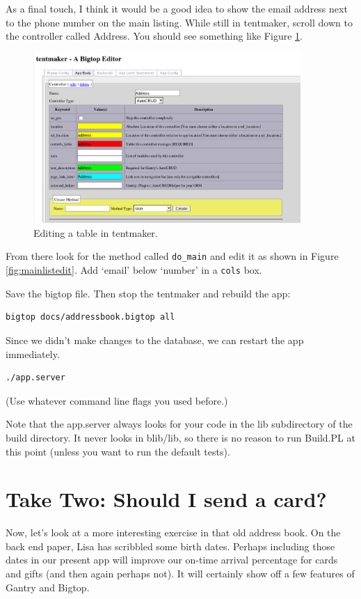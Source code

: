 As a final touch, I think it would be a good idea to show the email address
next to the phone number on the main listing.  While still in tentmaker,
scroll down to the controller called Address.  You should see something
like Figure \ref{fig:controledit}.

\begin{figure}
\includegraphics[width=4in]{controledit}
\caption{Editing a table in tentmaker.}
\label{fig:controledit}
\end{figure}

From there look for the method called \verb+do_main+ and edit it as
shown in Figure \ref{fig:mainlistedit}.  Add `email' below `number'
in a \verb+cols+ box.

Save the bigtop file.  Then stop the tentmaker and rebuild the app:

\begin{verbatim}
bigtop docs/addressbook.bigtop all
\end{verbatim}

Since we didn't make changes to the database, we can restart the app
immediately.

\begin{verbatim}
./app.server
\end{verbatim}

(Use whatever command line flags you used before.)

Note that the app.server always looks for your code in the lib subdirectory
of the build directory.  It never looks in blib/lib, so there is no
reason to run Build.PL at this point (unless you want to run the default
tests).

\section{Take Two: Should I send a card?}
\label{sec:asciiart}

Now, let's look at a more interesting exercise in that old address book.
On the back end paper, Lisa has scribbled some birth dates.
Perhaps including those dates in our present app will improve our on-time
arrival percentage for cards and gifts (and then again perhaps not).
It will certainly show off a few features of Gantry and Bigtop.

